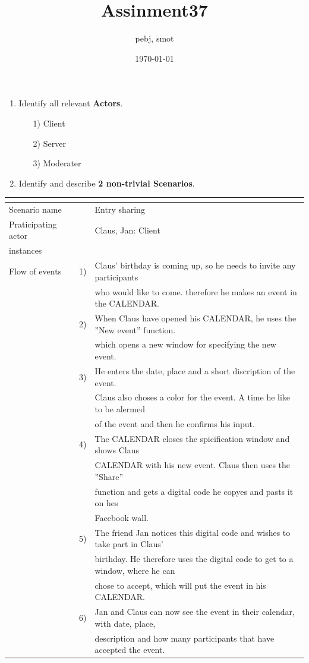 \documentclass[a4paper]{article}
\title{Assinment37}
\author{pebj, smot}
\date{\today}
\begin{document}
\maketitle


\begin{enumerate}
	\item Identify all relevant \textbf{Actors}.\\
    \begin{enumerate}
        \item[1)]Client
        \item[2)]Server
        \item[3)]Moderater
    \end{enumerate}
	\item Identify and describe \textbf{2 non-trivial Scenarios}.\\
\end{enumerate}
    


\begin{tabular}{l r @{} l}
	\multicolumn{2}{c}{} \\
	\hline
	Scenario name	&&Entry sharing\\
	\hline
	Praticipating actor	&&Claus, Jan: Client \\
	instances       	&&\\
	\hline
	Flow of events	&1)&Claus' birthday is coming up, so he needs to invite any participants\\ 
					&&who would like to come. therefore he makes an event in the CALENDAR.\\
				&2)&When Claus have opened his CALENDAR, he uses the ''New event'' function.\\
                	&&which opens a new window for specifying the new event. \\
				&3)&He enters the date, place and a short discription of the event.\\
					&&Claus also choses a color for the event. A time he like to be alermed\\
					&&of the event and then he confirms his input.\\
				&4)&The CALENDAR closes the spicification window and shows Claus\\
					&& CALENDAR with his new event. Claus then uses the ''Share''\\
					&&function and gets a digital code he copyes and pasts it on hes\\
					&&Facebook wall.\\
				&5)&The friend Jan notices this digital code and wishes to take part in Claus' \\ 
					&&birthday. He therefore uses the digital code to get to a window, where he can\\
					&&chose to accept, which will put the event in his CALENDAR.\\
				&6)&Jan and Claus can now see the event in their calendar, with date, place,\\
					&&description and how many participants that have accepted the event.\\
	\hline
\end{tabular}
\\
\end{document}
